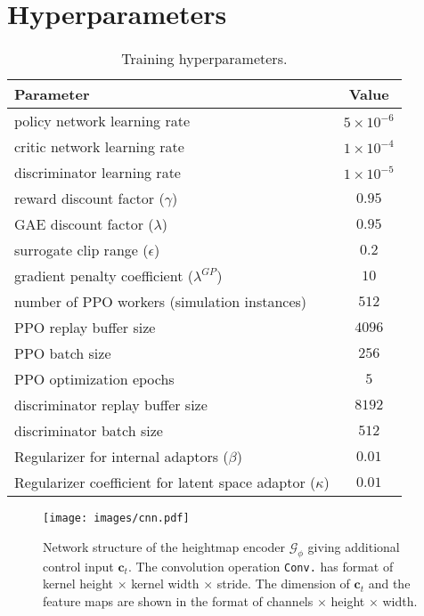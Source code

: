 \section{Hyperparameters}
\begin{table}[t]
\centering\vspace{20pt}
\caption{Training hyperparameters.}\vspace{-12pt}
\begin{tabular}{lc}
    \toprule
    \textbf{Parameter} & \textbf{Value}\\
    \midrule
    policy network learning rate & $5 \times 10^{-6}$\\
    critic network learning rate & $1 \times 10^{-4}$\\
    discriminator learning rate & $1 \times 10^{-5}$\\
    reward discount factor ($\gamma$) & $0.95$ \\
    GAE discount factor ($\lambda$) & $0.95$ \\
    surrogate clip range ($\epsilon$) & $0.2$ \\
    gradient penalty coefficient ($\lambda^{GP}$) & $10$ \\
    number of PPO workers (simulation instances) & $512$ \\
    PPO replay buffer size & $4096$ \\
    PPO batch size & $256$ \\
    PPO optimization epochs & $5$ \\
    discriminator replay buffer size & $8192$ \\
    discriminator batch size & $512$ \\
    Regularizer for internal adaptors ($\beta$) & $0.01$ \\
    Regularizer coefficient for latent space adaptor ($\kappa$) & $0.01$ \\
  \bottomrule
\end{tabular}
\label{tab:hyper}
\end{table}

\begin{figure}[t]
    \centering\vspace{-4pt}
    \texttt{[image: images/cnn.pdf]}\vspace{-8pt}
    \caption{Network structure of the heightmap encoder $\mathcal{G}_\phi$ giving additional control input $\mathbf{c}_t$. The convolution operation \texttt{Conv.} has format of kernel height $\times$ kernel width $\times$ stride. The dimension of $\mathbf{c}_t$ and the feature maps are shown in the format of channels $\times$ height $\times$ width.}\vspace{-8pt}
    \label{fig:cnn}
\end{figure}

